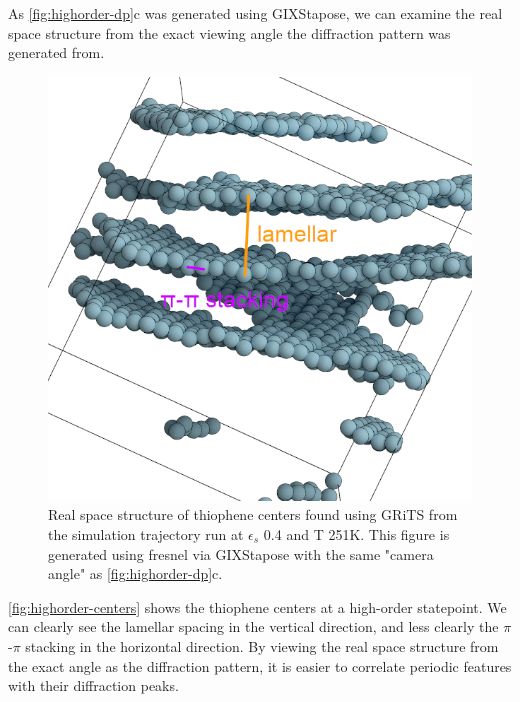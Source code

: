 As \autoref{fig:highorder-dp}c was generated using GIXStapose, we can examine the real space structure from the exact viewing angle the diffraction pattern was generated from. 
\begin{figure}
    \centering
    \includegraphics[width=0.8\linewidth]{figures/p3ht_val/scene_annotated.png}
    \caption{Real space structure of thiophene centers found using GRiTS from the simulation trajectory run at $\epsilon_{s}$ 0.4 and T 251K. This figure is generated using fresnel via GIXStapose with the same "camera angle" as \autoref{fig:highorder-dp}c. }\label{fig:highorder-centers}
\end{figure}
\autoref{fig:highorder-centers} shows the thiophene centers at a high-order statepoint. We can clearly see the lamellar spacing in the vertical direction, and less clearly the $\pi$-$\pi$ stacking in the horizontal direction. By viewing the real space structure from the exact angle as the diffraction pattern, it is easier to correlate periodic features with their diffraction peaks.

